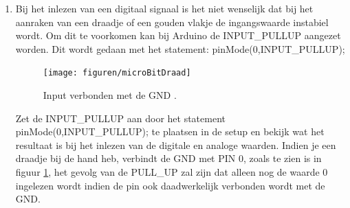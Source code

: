 \begin{enumerate}
\item Bij het inlezen van een digitaal signaal is het niet wenselijk dat bij het aanraken van een draadje of een gouden vlakje de ingangswaarde instabiel wordt. Om dit te voorkomen kan bij Arduino de  \textcolor{arduinoBlue}{INPUT\_PULLUP} aangezet worden. Dit wordt gedaan met het statement: \textcolor{arduinoOrange}{pinMode}(0,\textcolor{arduinoBlue}{INPUT\_PULLUP}); 

\begin{minipage}{\linewidth}
\begin{figure}
	\vspace{-15pt}
	\begin{center}
		\centering
		\captionsetup{justification=centering}
		\texttt{[image: figuren/microBitDraad]}
	\end{center}
	\caption{Input verbonden met de GND .}
	\label{fig:micrDraad}
\end{figure}
Zet de \textcolor{arduinoBlue}{INPUT\_PULLUP} aan door het statement 
\textcolor{arduinoOrange}{pinMode}(0,\textcolor{arduinoBlue}{INPUT\_PULLUP});  
te plaatsen in de \textcolor{arduinoGreen}{setup} en bekijk wat het resultaat is bij het inlezen van de digitale en analoge waarden. Indien je een draadje bij de hand heb, verbindt de GND met PIN 0, zoals te zien is in figuur \ref{fig:micrDraad}, het gevolg van de PULL\_UP zal zijn dat alleen nog de waarde 0 ingelezen wordt indien de pin ook daadwerkelijk verbonden wordt met de GND.
\end{minipage}

\end{enumerate}

